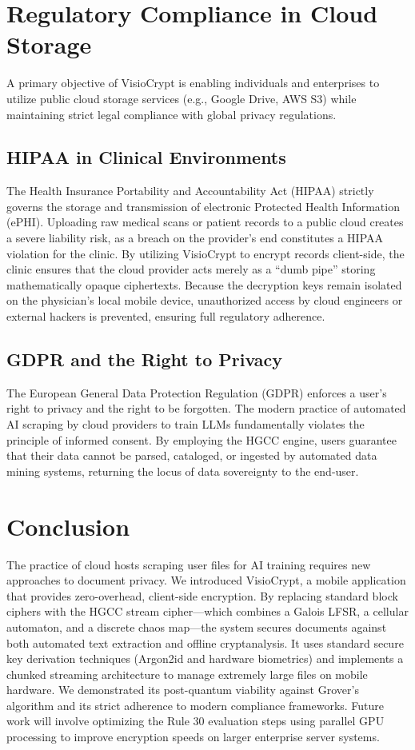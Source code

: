 \documentclass[runningheads]{llncs}
\begin{document}
\section{Regulatory Compliance in Cloud Storage}
A primary objective of VisioCrypt is enabling individuals and enterprises to utilize public cloud storage services (e.g., Google Drive, AWS S3) while maintaining strict legal compliance with global privacy regulations.

\subsection{HIPAA in Clinical Environments}
The Health Insurance Portability and Accountability Act (HIPAA) strictly governs the storage and transmission of electronic Protected Health Information (ePHI). Uploading raw medical scans or patient records to a public cloud creates a severe liability risk, as a breach on the provider's end constitutes a HIPAA violation for the clinic. By utilizing VisioCrypt to encrypt records client-side, the clinic ensures that the cloud provider acts merely as a ``dumb pipe'' storing mathematically opaque ciphertexts. Because the decryption keys remain isolated on the physician's local mobile device, unauthorized access by cloud engineers or external hackers is prevented, ensuring full regulatory adherence.

\subsection{GDPR and the Right to Privacy}
The European General Data Protection Regulation (GDPR) enforces a user's right to privacy and the right to be forgotten. The modern practice of automated AI scraping by cloud providers to train LLMs fundamentally violates the principle of informed consent. By employing the HGCC engine, users guarantee that their data cannot be parsed, cataloged, or ingested by automated data mining systems, returning the locus of data sovereignty to the end-user.

\section{Conclusion}
The practice of cloud hosts scraping user files for AI training requires new approaches to document privacy. We introduced VisioCrypt, a mobile application that provides zero-overhead, client-side encryption. By replacing standard block ciphers with the HGCC stream cipher---which combines a Galois LFSR, a cellular automaton, and a discrete chaos map---the system secures documents against both automated text extraction and offline cryptanalysis. It uses standard secure key derivation techniques (Argon2id and hardware biometrics) and implements a chunked streaming architecture to manage extremely large files on mobile hardware. We demonstrated its post-quantum viability against Grover's algorithm and its strict adherence to modern compliance frameworks. Future work will involve optimizing the Rule 30 evaluation steps using parallel GPU processing to improve encryption speeds on larger enterprise server systems.
\end{document}
